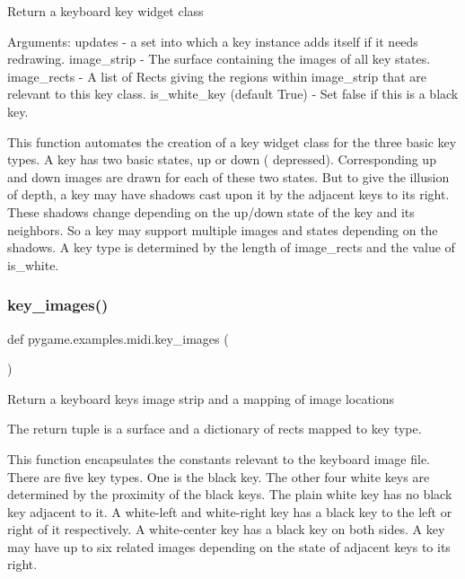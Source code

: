 \begin{DoxyVerb}Return a keyboard key widget class

Arguments:
updates - a set into which a key instance adds itself if it needs
    redrawing.
image_strip - The surface containing the images of all key states.
image_rects - A list of Rects giving the regions within image_strip that
    are relevant to this key class.
is_white_key (default True) - Set false if this is a black key.

This function automates the creation of a key widget class for the
three basic key types. A key has two basic states, up or down (
depressed). Corresponding up and down images are drawn for each
of these two states. But to give the illusion of depth, a key
may have shadows cast upon it by the adjacent keys to its right.
These shadows change depending on the up/down state of the key and
its neighbors. So a key may support multiple images and states
depending on the shadows. A key type is determined by the length
of image_rects and the value of is_white.\end{DoxyVerb}
 \mbox{\label{namespacepygame_1_1examples_1_1midi_a033e6692a39db20d70c604209f388e02}} 
\subsubsection{\texorpdfstring{key\+\_\+images()}{key\_images()}}
{\footnotesize\ttfamily def pygame.\+examples.\+midi.\+key\+\_\+images (\begin{DoxyParamCaption}{ }\end{DoxyParamCaption})}

\begin{DoxyVerb}Return a keyboard keys image strip and a mapping of image locations

The return tuple is a surface and a dictionary of rects mapped to key
type.

This function encapsulates the constants relevant to the keyboard image
file. There are five key types. One is the black key. The other four
white keys are determined by the proximity of the black keys. The plain
white key has no black key adjacent to it. A white-left and white-right
key has a black key to the left or right of it respectively. A white-center
key has a black key on both sides. A key may have up to six related
images depending on the state of adjacent keys to its right.\end{DoxyVerb}
 \mbox{\label{namespacepygame_1_1examples_1_1midi_adaa61334b0feded68d7da651d0045d63}} 
